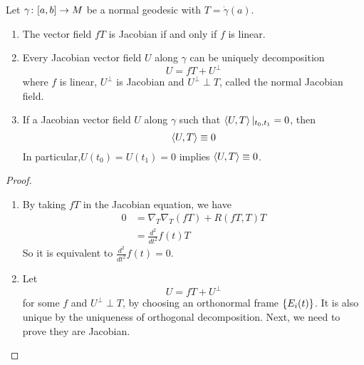 \begin{enumerate}[label=\arabic{*}.]
	\begin{prop}
		Let $\gamma \colon [a,b] \rightarrow M$ be a normal geodesic with $T = \dot{\gamma}(a)$.
		\begin{enumerate}[label=(\arabic{*})]
			\item The vector field $fT$ is Jacobian if and only if $f$ is linear.
			\item Every Jacobian vector field $U$ along $\gamma$ can be uniquely decomposition
			\begin{equation*}
				U = fT + U^\perp
			\end{equation*}
			where $f$ is linear, $U^\perp$ is Jacobian and $U^\perp \perp T$, called the normal Jacobian field.
			\item If a Jacobian vector field $U$ along $\gamma$ such that $\left\langle U,T \right\rangle|_{t_0,t_1} = 0$, then
			\begin{equation*}
				\left\langle U,T \right\rangle \equiv 0
			\end{equation*}
			In particular,$U(t_0)=U(t_1)=0$ implies $\left\langle U,T \right\rangle \equiv 0$. 
		\end{enumerate}
	\end{prop}
	\begin{proof}
		\begin{enumerate}[label=(\arabic{*})]
			\item By taking $fT$ in the Jacobian equation, we have
			\begin{equation*}
				\begin{aligned}
					0 &= \nabla_T\nabla_T(fT) + R(fT,T)T \\
					&= \frac{d^2}{dt^2}f(t)T
				\end{aligned}
			\end{equation*}
			So it is equivalent to $\frac{d^2}{dt^2}f(t) =0$.

			\item Let
			\begin{equation*}
				U = fT + U^\perp
			\end{equation*}
			for some $f$ and $U^\perp \perp T$, by choosing an orthonormal frame $\left\{E_i(t)\right\}$. It is also unique by the uniqueness of orthogonal decomposition. Next, we need to prove they are Jacobian.


\end{enumerate}
\end{proof}
\end{enumerate}
